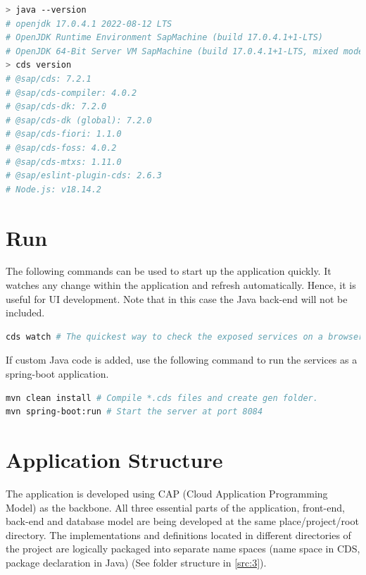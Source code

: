 \begin{lstlisting}[language={bash}]
> java --version
# openjdk 17.0.4.1 2022-08-12 LTS
# OpenJDK Runtime Environment SapMachine (build 17.0.4.1+1-LTS)
# OpenJDK 64-Bit Server VM SapMachine (build 17.0.4.1+1-LTS, mixed mode, sharing)
> cds version
# @sap/cds: 7.2.1
# @sap/cds-compiler: 4.0.2
# @sap/cds-dk: 7.2.0
# @sap/cds-dk (global): 7.2.0
# @sap/cds-fiori: 1.1.0
# @sap/cds-foss: 4.0.2
# @sap/cds-mtxs: 1.11.0
# @sap/eslint-plugin-cds: 2.6.3
# Node.js: v18.14.2
\end{lstlisting}


\section{Run}
\label{sec:D-run}

The following commands can be used to start up the application quickly. It watches any change within the application and refresh automatically. Hence, it is useful for UI development. Note that in this case the Java back-end will not be included.

\begin{lstlisting}[language={bash}]
cds watch # The quickest way to check the exposed services on a browser.
\end{lstlisting}

If custom Java code is added, use the following command to run the services as a spring-boot application.
\begin{lstlisting}[language={bash}]
mvn clean install # Compile *.cds files and create gen folder.
mvn spring-boot:run # Start the server at port 8084
\end{lstlisting}

\section{Application Structure}
\label{sec:D-AppStructure}

The application is developed using CAP (Cloud Application Programming Model) \cite{cap-welcome} as the backbone. 
All three essential parts of the application, front-end, back-end and database model are being developed at the same place/project/root directory. 
The implementations and definitions located in different directories of the project are logically packaged into separate name spaces (name space in CDS, package declaration in Java) (See folder structure in \autoref{src:3}).

